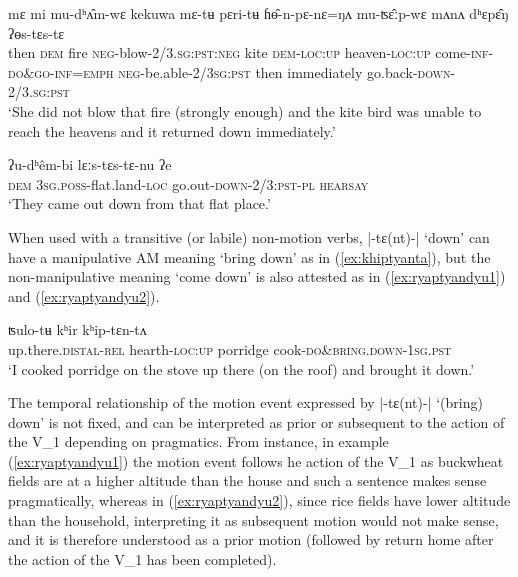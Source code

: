 \documentclass[oneside,a4paper,11pt]{article}
\newcommand{\ipa}[1]{{\phon#1}}
\newcommand{\dhatu}[2]{|\ipa{#1}| `#2'}
\begin{document}
\begin{exe}
\ex \label{ex:yostyastya}
 \gll \ipa{mʌnʌ}	\ipa{mɛ}	\ipa{mi}	\ipa{mu-dʰʌ̂m-wɛ}	\ipa{kekuwa}	\ipa{mɛ-tʉ}	\ipa{pɛri-tʉ}	\ipa{ɦɵ̂-n-pɛ-nɛ=ŋʌ}	\ipa{mu-ʦɛ̂ːp-wɛ}	\ipa{mʌnʌ}	\ipa{dʰɛpɛ̂ŋ}	\ipa{ʔɵs-tɛs-tɛ}	 \\
 then \textsc{dem} fire \textsc{neg}-blow-\textsc{2/3.sg:pst:neg} kite \textsc{dem}-\textsc{loc}:\textsc{up} heaven-\textsc{loc}:\textsc{up} come-\textsc{inf}-\textsc{do\&go}-\textsc{inf}=\textsc{emph} \textsc{neg}-be.able-\textsc{2/3sg:pst} then immediately go.back-\textsc{down}-2/3.\textsc{sg}:\textsc{pst} \\
   \glt `She did not blow that fire (strongly enough) and the kite bird was unable to reach the heavens and it returned down immediately.'
 \end{exe}
 
 \begin{exe}
\ex \label{ex:lyaastyastyanu}
 \gll  \ipa{mɛ}	\ipa{ʔu-dʰêm-bi}	\ipa{lɛːs-tɛs-tɛ-nu}	\ipa{ʔe}  \\
 \textsc{dem} \textsc{3sg.poss}-flat.land-\textsc{loc} go.out-\textsc{down}-2/3:\textsc{pst}-\textsc{pl} \textsc{hearsay} \\
 \glt `They came out down from that flat place.'
  \end{exe}
  
When used with a transitive (or labile) non-motion verbs, \dhatu{-tɛ(nt)-}{down} can have  a manipulative AM meaning `bring down' as in (\ref{ex:khiptyanta}), but the non-manipulative meaning `come down' is also attested as in (\ref{ex:ryaptyandyu1}) and (\ref{ex:ryaptyandyu2}).
 
\begin{exe}
\ex \label{ex:khiptyanta}
 \gll \ipa{tukkâ-m}	\ipa{ʦulo-tʉ}	\ipa{kʰir}	\ipa{kʰip-tɛn-tʌ} \\
  up.there.\textsc{distal}-\textsc{rel} hearth-\textsc{loc}:\textsc{up} porridge cook-\textsc{do\&bring.down}-\textsc{1sg}.\textsc{pst} \\
  \glt `I cooked porridge on the stove up there (on the roof) and brought it down.'
 \end{exe}
 
The temporal relationship of the motion event expressed by  \dhatu{-tɛ(nt)-}{(bring) down} is not fixed, and can be interpreted as prior or subsequent to the action of the V_1 depending on pragmatics. From instance, in example   (\ref{ex:ryaptyandyu1}) the motion event follows he action of the V_1 as buckwheat fields are at a higher altitude than the house and such a sentence makes sense pragmatically, whereas in   (\ref{ex:ryaptyandyu2}),  since rice fields have lower altitude than the household, interpreting it as subsequent motion would not make sense, and it is therefore understood as a prior motion (followed by return home after the action of the V_1 has been completed).
\end{document}
